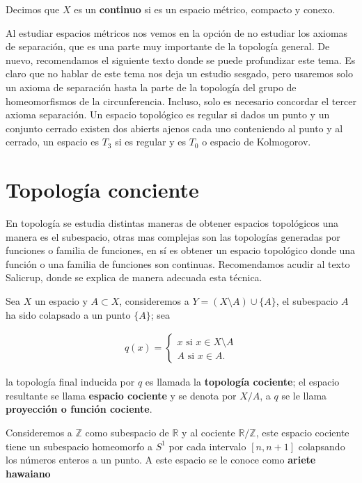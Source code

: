 \begin{df}
Decimos que $X$ es un \textbf{continuo} si es un espacio métrico, compacto y conexo.
\end{df}

Al estudiar espacios métricos nos vemos en la opción de no estudiar los axiomas de separación, que es una parte muy importante de la topología general. De nuevo, recomendamos el siguiente texto donde se puede profundizar este tema. Es claro que no hablar de este tema nos deja un estudio sesgado, pero usaremos solo un axioma de separación hasta la parte de la topología del grupo de homeomorfismos de la circunferencia. Incluso, solo es necesario concordar el tercer axioma separación. Un espacio topológico es regular si dados un punto y un conjunto cerrado existen dos abierts ajenos cada uno conteniendo al punto y al cerrado, un espacio es $T_3$ si es regular y es $T_0$ o espacio de Kolmogorov. 


\section*{Topología conciente}

En topología se estudia distintas maneras de obtener espacios topológicos una manera es el subespacio, otras mas complejas son las topologías generadas por funciones o familia de funciones, en sí es obtener un espacio topológico donde una función o una familia de funciones son continuas. Recomendamos acudir al texto Salicrup, donde se explica de manera adecuada esta técnica. 

Sea $X$ un espacio y $A \subset X$, consideremos a $Y=(X\setminus A) \cup \{A\}$, el subespacio $A$ ha sido colapsado a un punto $\{A\}$; sea

\begin{align*}
q(x)= \begin{cases}
x \text{ si } x \in X\setminus A \\
A \text{ si } x \in A.
\end{cases}
\end{align*}

la topología final inducida por $q$ es llamada la \textbf{topología cociente}; el espacio resultante se llama \textbf{espacio cociente} y se denota por $X/A$, a $q$ se le llama \textbf{proyección o función cociente}.

\begin{ej}
Consideremos a $\mathbb{Z}$ como subespacio de $\mathbb{R}$ y al cociente $\mathbb{R}/\mathbb{Z}$, este espacio cociente tiene un subespacio homeomorfo a $S^1$ por cada intervalo $[n,n+1]$ colapsando los números enteros a un punto. A este espacio se le conoce como \textbf{ariete hawaiano}
\end{ej}

